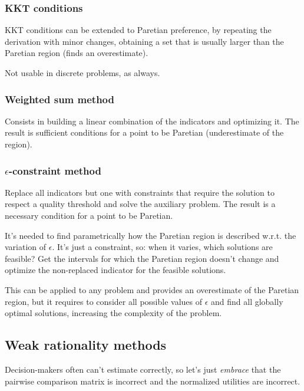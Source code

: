 \subsubsection{KKT conditions}

KKT conditions can be extended to Paretian preference, by repeating the derivation with minor changes, obtaining a set that is usually larger than the Paretian region (finds an overestimate).

Not usable in discrete problems, as always.  

\subsubsection{Weighted sum method}

Consists in building a linear combination of the indicators and optimizing it. The result is sufficient conditions for a point to be Paretian (underestimate of the region).


\subsubsection{$\epsilon$-constraint method}

Replace all indicators but one with constraints that require the solution to respect a quality threshold and solve the auxiliary problem. The result is a necessary condition for a point to be Paretian.

It's needed to find parametrically how the Paretian region is described w.r.t. the variation of $\epsilon$. It's just a constraint, so: when it varies, which solutions are feasible? Get the intervals for which the Paretian region doesn't change and optimize the non-replaced indicator for the feasible solutions.

This can be applied to any problem and provides an overestimate of the Paretian region, but it requires to consider all possible values of $\epsilon$ and find all globally optimal solutions, increasing the complexity of the problem. 

\subsection{Weak rationality methods}

Decision-makers often can't estimate correctly, so let's just \textit{embrace} that the pairwise comparison matrix is incorrect and the normalized utilities are incorrect.

